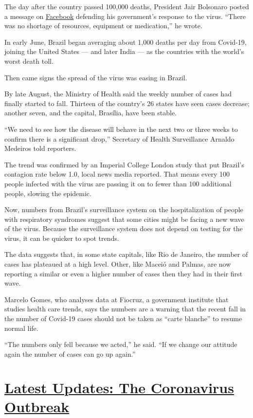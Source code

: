 The day after the country passed 100,000 deaths, President Jair
Bolsonaro posted a message on
\href{https://www.facebookcorewwwi.onion/jairmessias.bolsonaro/posts/2045837842231858}{Facebook}
defending his government's response to the virus. ``There was no
shortage of resources, equipment or medication,'' he wrote.

In early June, Brazil began averaging about 1,000 deaths per day from
Covid-19, joining the United States --- and later India --- as the
countries with the world's worst death toll.

Then came signs the spread of the virus was easing in Brazil.

By late August, the Ministry of Health said the weekly number of cases
had finally started to fall. Thirteen of the country's 26 states have
seen cases decrease; another seven, and the capital, Brasília, have been
stable.

``We need to see how the disease will behave in the next two or three
weeks to confirm there is a significant drop,'' Secretary of Health
Surveillance Arnaldo Medeiros told reporters.

The trend was confirmed by an Imperial College London study that put
Brazil's contagion rate below 1.0, local news media reported. That means
every 100 people infected with the virus are passing it on to fewer than
100 additional people, slowing the epidemic.

Now, numbers from Brazil's surveillance system on the hospitalization of
people with respiratory syndromes suggest that some cities might be
facing a new wave of the virus. Because the surveillance system does not
depend on testing for the virus, it can be quicker to spot trends.

The data suggests that, in some state capitals, like Rio de Janeiro, the
number of cases has plateaued at a high level. Other, like Maceió and
Palmas, are now reporting a similar or even a higher number of cases
then they had in their first wave.

Marcelo Gomes, who analyses data at Fiocruz, a government institute that
studies health care trends, says the numbers are a warning that the
recent fall in the number of Covid-19 cases should not be taken as
``carte blanche'' to resume normal life.

``The numbers only fell because we acted,'' he said. ``If we change our
attitude again the number of cases can go up again.''

\hypertarget{latest-updates-the-coronavirus-outbreak}{%
\section{\texorpdfstring{\href{https://www.nytimes3xbfgragh.onion/2020/09/08/world/covid-19-coronavirus.html?action=click\&pgtype=Article\&state=default\&region=MAIN_CONTENT_1\&context=storylines_live_updates}{Latest
Updates: The Coronavirus
Outbreak}}{Latest Updates: The Coronavirus Outbreak}}\label{latest-updates-the-coronavirus-outbreak}}

